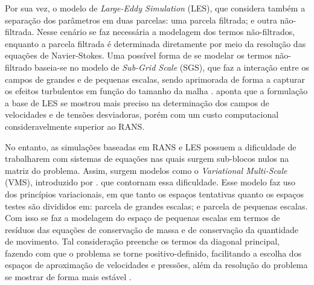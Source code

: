 \documentclass[_ArquivoPrincipal.tex]{subfiles}
\begin{document}
Por sua vez, o modelo de \textit{Large-Eddy Simulation} (LES), que considera também a separação dos parâmetros em duas parcelas: uma parcela filtrada; e outra não-filtrada. Nesse cenário se faz necessária a modelagem dos termos não-filtrados, enquanto a parcela filtrada é determinada diretamente por meio da resolução das equações de Navier-Stokes. Uma possível forma de se modelar os termos não-filtrado baseia-se no modelo de \textit{Sub-Grid Scale} (SGS), que faz a interação entre os campos de grandes e de pequenas escalas, sendo aprimorada de forma a capturar os efeitos turbulentos em função do tamanho da malha \cite{ghosal1995basic,hughes2000large,moeng2015large}.
 aponta que a formulação a base de LES se mostrou mais preciso na determinação dos campos de velocidades e de tensões desviadoras, porém com um custo computacional consideravelmente superior ao RANS.

No entanto, as simulações baseadas em RANS e LES possuem a dificuldade de trabalharem com sistemas de equações nas quais surgem sub-blocos nulos na matriz do problema. Assim, surgem modelos como o \textit{Variational Multi-Scale} (VMS), introduzido por . que contornam essa dificuldade. Esse modelo faz uso dos princípios variacionais, em que tanto os espaços tentativas quanto os espaços testes são divididos em: parcela de grandes escalas; e parcela de pequenas escalas. Com isso se faz a modelagem do espaço de pequenas escalas em termos de resíduos das equações de conservação de massa e de conservação da quantidade de movimento. Tal consideração preenche os termos da diagonal principal, fazendo com que o problema se torne positivo-definido, facilitando a escolha dos espaços de aproximação de velocidades e pressões, além da resolução do problema se mostrar de forma mais estável \cite{bazilevs2013computational,sondak2015new}.
\end{document}
